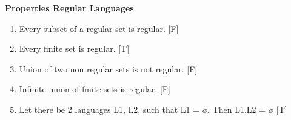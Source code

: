 
\centerline{\textbf{ \LARGE  Properties Regular Languages }}

\begin{enumerate}
    \item Every subset of a regular set is regular. [F]
    \item Every finite set is regular. [T]
    \item Union of two non regular sets is not regular. [F]
    \item Infinite union of finite sets is regular. [F]
    \item Let there be 2 languages L1, L2, such that L1 = {\large \( \phi \)}. Then L1.L2 = {\large \(\phi\) } [T]

\end{enumerate}



\begin{comment}

    \( \mathbf {  } \)  \text{a}^\text{b}  \text{a}^*

    (00)^*   \lambda   \phi

\end{comment}

